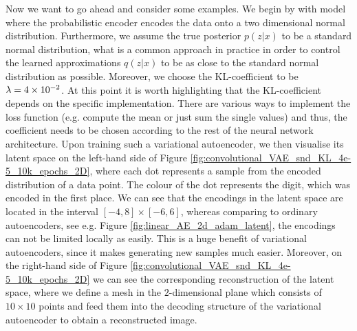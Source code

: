 Now we want to go ahead and consider some examples. We begin by with model where the probabilistic encoder encodes the data onto a two dimensional normal distribution. Furthermore, we assume the true posterior $p(z|x)$ to be a standard normal distribution, what is a common approach in practice in order to control the learned approximations $q(z|x)$ to be as close to the standard normal distribution as possible. Moreover, we choose the KL-coefficient to be $\lambda=\num{4e-2}$. At this point it is worth highlighting that the KL-coefficient depends on the specific implementation. There are various ways to implement the loss function (e.g. compute the mean or just sum the single values) and thus, the coefficient needs to be chosen according to the rest of the neural network architecture.
Upon training such a variational autoencoder, we then visualise its latent space on the left-hand side of Figure \ref{fig:convolutional_VAE_snd_KL_4e-5_10k_epochs_2D}, where each dot represents a sample from the encoded distribution of a data point. The colour of the dot represents the digit, which was encoded in the first place. We can see that the encodings in the latent space are located in the interval $[-4, 8]\times [-6, 6]$, whereas comparing to ordinary autoencoders, see e.g. Figure \ref{fig:linear_AE_2d_adam_latent}, the encodings can not be limited locally as easily. This is a huge benefit of variational autoencoders, since it makes generating new samples much easier. Moreover, on the right-hand side of Figure \ref{fig:convolutional_VAE_snd_KL_4e-5_10k_epochs_2D} we can see the corresponding reconstruction of the latent space, where we define a mesh in the $2$-dimensional plane which consists of $10\times 10$ points and feed them into the decoding structure of the variational autoencoder to obtain a reconstructed image.

